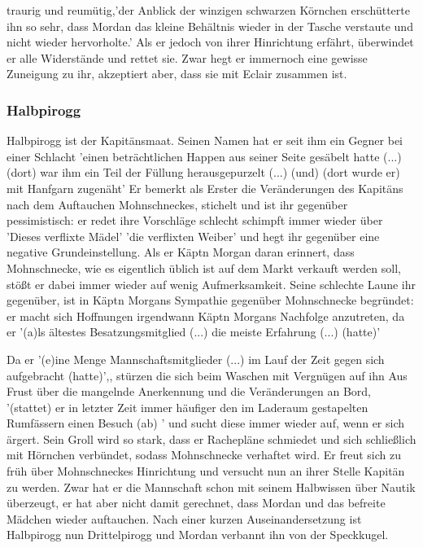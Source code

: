 traurig und reumütig,\cite[S.582ff]{pir}'der Anblick der winzigen schwarzen Körnchen erschütterte ihn so sehr, dass Mordan das kleine Behältnis wieder in der Tasche verstaute und nicht wieder hervorholte.'\cite[S.531]{pir} Als er jedoch von ihrer Hinrichtung erfährt, überwindet er alle Widerstände und rettet sie. \cite[S.620]{pir} Zwar hegt er immernoch eine gewisse Zuneigung zu ihr, akzeptiert aber, dass sie mit Eclair zusammen ist. \cite[S.632f]{pir}

\subsubsection{Halbpirogg}
Halbpirogg ist der Kapitänsmaat. Seinen Namen hat er seit ihm ein Gegner bei einer Schlacht 
'einen beträchtlichen Happen aus seiner Seite gesäbelt hatte (...)(dort) 
war ihm ein Teil der Füllung herausgepurzelt (...) 
(und) (dort wurde er) mit Hanfgarn zugenäht'\cite[S. 33]{pir}
Er bemerkt als Erster die Veränderungen des Kapitäns nach 
dem Auftauchen Mohnschneckes, stichelt und ist ihr gegenüber pessimistisch:
er redet ihre Vorschläge schlecht \cite[S. 266]{pir} schimpft immer wieder über 'Dieses verflixte Mädel'\cite[S. 145]{pir}
'die verflixten Weiber' \cite[302]{pir}und 
hegt ihr gegenüber eine negative Grundeinstellung. \cite[S. 297]{pir}
Als er Käptn Morgan daran erinnert, dass Mohnschnecke, wie es eigentlich üblich ist \cite[S.50]{pir} 
auf dem Markt verkauft werden soll,\cite[S.129]{pir} stößt er dabei immer wieder auf wenig Aufmerksamkeit. \cite[S. 145]{pir}
Seine schlechte Laune ihr gegenüber, ist in Käptn Morgans Sympathie gegenüber Mohnschnecke begründet: er macht
sich Hoffnungen irgendwann Käptn Morgans Nachfolge anzutreten, 
da er '(a)ls ältestes Besatzungsmitglied (...) die meiste Erfahrung (...) (hatte)'\cite[S.371]{pir}
 
Da er '(e)ine Menge Mannschaftsmitglieder (...) im Lauf der Zeit gegen sich aufgebracht (hatte)',\cite[S.151]{pir}, 
stürzen die sich beim Waschen mit Vergnügen auf ihn \cite[S.151]{pir}
Aus Frust über die mangelnde Anerkennung und die Veränderungen an Bord, 
'(stattet) er in letzter Zeit immer häufiger den im Laderaum gestapelten Rumfässern 
einen Besuch (ab) '\cite[S. 181]{pir} und sucht diese immer wieder auf, wenn er sich ärgert.\cite[S. 303]{pir} Sein Groll wird so stark, dass er Rachepläne schmiedet \cite[S.535ff]{pir} und sich schließlich mit Hörnchen verbündet, \cite[S.539ff]{pir} sodass Mohnschnecke verhaftet wird.\cite[S.555]{pir} Er freut sich zu früh über Mohnschneckes Hinrichtung \cite[S.622]{pir} und versucht nun an ihrer Stelle Kapitän zu werden.\cite[S.622]{pir} Zwar hat er die Mannschaft schon mit seinem Halbwissen über Nautik überzeugt, \cite[S.623]{pir} er hat aber nicht damit gerechnet, dass Mordan und das befreite Mädchen wieder auftauchen.\cite[S.626]{pir} Nach einer kurzen Auseinandersetzung \cite[S.627f]{pir} ist Halbpirogg nun Drittelpirogg\cite[S.630]{pir} und Mordan verbannt ihn von der Speckkugel.\cite[S.630]{pir}


